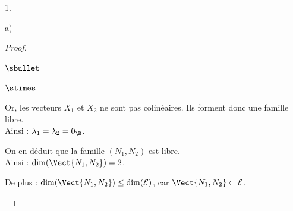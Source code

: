 \begin{noliste}{1.}
\begin{noliste}{a)}
\begin{proof}
\begin{noliste}{$\sbullet$}
\begin{noliste}{$\stimes$}
            \item Or, les vecteurs $X_1$ et $X_2$ ne sont pas
              colinéaires. Ils forment donc une famille libre.\\
              Ainsi : $\lambda_1=\lambda_2=0_{\R}$.
	  \end{noliste}
	  On en déduit que la famille $(N_1,N_2)$ est libre.\\
	  Ainsi : $\dim(\Vect{N_1,N_2}) = 2$.
	  
	  \item De plus : $\dim(\Vect{N_1,N_2}) \leq \dim({\cal E})$, 
	  car $\Vect{N_1,N_2} \subset {\cal E}$.
	  ~\\[-1.4cm]
      \end{noliste}
    \end{proof}

  \end{noliste}
\end{noliste}


